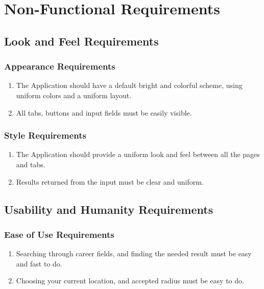 \documentclass[english]{article}
\begin{document}
\section{Non-Functional Requirements}
\label{sec:non-functional_requirements}
\subsection{Look and Feel Requirements}
\label{sub:look_and_feel_requirements}

\subsubsection{Appearance Requirements}
\label{ssub:appearance_requirements}
\begin{enumerate}[{AR}1. ]

\item The Application should have a default bright and colorful scheme, using uniform colors and a uniform layout.

\item All tabs, buttons and input fields must be easily visible.


\end{enumerate}

\subsubsection{Style Requirements}
\label{ssub:style_requirements}
\begin{enumerate}[{SR}1. ]
\item The Application should provide a uniform look and feel between all the pages and tabs.

\item Results returned from the input must be clear and uniform.
\end{enumerate}


\subsection{Usability and Humanity Requirements}
\label{sub:usability_and_humanity_requirements}

\subsubsection{Ease of Use Requirements}
\label{ssub:ease_of_use_requirements}
\begin{enumerate}[{EUR}1. ]

\item Searching through career fields, and finding the needed result must be easy and fast to do.

\item Choosing your current location, and accepted radius must be easy to do.

\end{enumerate}
\end{document}
